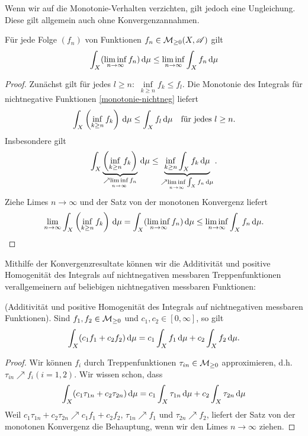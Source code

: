 Wenn wir auf die Monotonie-Verhalten verzichten, gilt jedoch eine Ungleichung. Diese gilt allgemein auch ohne Konvergenzannahmen.
\begin{satz}
\begin{mdframed}
Für jede Folge $(f_n)$ von Funktionen $f_n \in \mathcal{M}_{\geq 0}(X,\mathscr{A})$ gilt
$$
\int_X (\liminf\limits_{n\to\infty} f_n)\, \mathrm{d} \mu \leq \liminf\limits_{n\to \infty} \int_X f_n \, \mathrm{d}\mu
$$
\end{mdframed}
\begin{proof}
Zunächst gilt für jedes $l\geq n:$ $\inf\limits_{k \geq n}f_k \leq f_l$. Die Monotonie des Integrals für nichtnegative Funktionen \eqref{monotonie-nichtneg} liefert
$$
\int_X \left(\inf_{k\geq n} f_k\right) \, \mathrm{d} \mu \leq  \int_X f_l \, \mathrm{d} \mu \quad \text{für jedes } l \geq n.
$$
Insbesondere gilt
$$
\int_X \underbrace{\left(\inf_{k\geq n} f_k\right)}_{\nearrow \liminf\limits_{n\to\infty} f_n} \, \mathrm{d} \mu \leq  \underbrace{\inf_{k\geq n}  \int_X f_k \, \mathrm{d} \mu}_{\nearrow \liminf\limits_{n\to \infty}\int_X f_n \, \mathrm{d} \mu}.
$$
Ziehe Limes $n\to \infty $ und der Satz von der monotonen Konvergenz liefert
$$\lim_{n\to \infty }\int_X \left(\inf_{k\geq n} f_k\right) \, \mathrm{d} \mu= \int_X (\liminf_{n\to\infty} f_n) \, \mathrm{d} \mu \leq \liminf_{n\to \infty}\int_X f_n \, \mathrm{d} \mu.  \qedhere$$
\end{proof}
\end{satz}

Mithilfe der Konvergenzresultate können wir die Additivität und positive Homogenität des Integrals auf nichtnegativen messbaren Treppenfunktionen verallgemeinern auf beliebigen nichtnegativen messbaren Funktionen:

\begin{lemma} \label{homogen-nicht-neg}
\begin{mdframed}(Additivität und positive Homogenität des Integrals auf nichtnegativen messbaren Funktionen).
Sind $f_1,f_2\in \mathcal{M}_{\geq 0}$ und $c_1,c_2\in [0,\infty]$, so gilt
\begin{equation} \label{additivitaet-nichtneg}
\int_X (c_1f_1+c_2f_2)\, \mathrm{d} \mu = c_1 \int_X f_1 \, \mathrm{d} \mu +c_2 \int_X f_2 \, \mathrm{d} \mu.
\end{equation}
\end{mdframed}
\begin{proof}
Wir können $f_i$ durch Treppenfunktionen $\tau_{in} \in \mathcal{M}_{\geq 0}$ approximieren, d.h. $\tau_{in}\nearrow f_i (i=1,2)$. Wir wissen schon, dass
$$
\int_X (c_1 \tau_{1n}+c_2 \tau_{2n}) \, \mathrm{d} \mu =c_1 \int_X \tau_{1n}\, \mathrm{d} \mu+c_2 \int_X \tau_{2n} \, \mathrm{d} \mu
$$
Weil $c_1 \tau_{1n}+c_2 \tau_{2n} \nearrow c_1f_1+c_2f_2$, $\tau_{1n}\nearrow f_1$ und $\tau_{2n}\nearrow f_2$, liefert der Satz von der monotonen Konvergenz die Behauptung, wenn wir den Limes $n\to \infty$ ziehen.
\end{proof}
\end{lemma}

